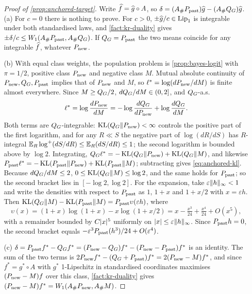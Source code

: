 \begin{proof}[Proof of \cref{prop:anchored-target}]
Write $\widehat{f}=\widehat{g}\circ A$, so $\delta=(A_\#P_{\mathrm{past}})\widehat{g}-(A_\#Q_{G})\widehat{g}$.
(a) For $c=0$ there is nothing to prove. For $c>0$, $\pm\widehat{g}/c\in\operatorname{Lip}_1$ is integrable under
both standardised laws, and \cref{fact:kr-duality} gives $\pm\delta/c\le W_{1}(A_\#P_{\mathrm{past}},A_\#Q_{G})$. If
$Q_{G}=P_{\mathrm{past}}$ the two means coincide for any integrable $\widehat{f}$, whatever $P_{\mathrm{new}}$.

(b) With equal class weights, the population problem is \cref{prop:bayes-logit} with $\pi=1/2$,
positive class $P_{\mathrm{new}}$ and negative class $M$. Mutual absolute continuity of $P_{\mathrm{new}},Q_{G},P_{\mathrm{past}}$
implies that of $P_{\mathrm{new}}$ and $M$, so $\ell^{*}=\log(dP_{\mathrm{new}}/dM)$ is finite almost everywhere. Since
$M\ge Q_{G}/2$, $dQ_{G}/dM\in(0,2]$, and $Q_{G}$-a.s.
\[
  \ell^{*}=\log\frac{dP_{\mathrm{new}}}{dM}=-\log\frac{dQ_{G}}{dP_{\mathrm{new}}}+\log\frac{dQ_{G}}{dM}.
\]
Both terms are $Q_{G}$-integrable: $\operatorname{KL}(Q_{G}\Vert P_{\mathrm{new}})<\infty$ controls the positive part of the
first logarithm, and for any $R\ll S$ the negative part of $\log(dR/dS)$ has $R$-integral
$\mathbb{E}_R\log^+(dS/dR)\le\mathbb{E}_R(dS/dR)\le1$; the second logarithm is bounded above by $\log2$. Integrating,
$Q_{G}\ell^{*}=-\operatorname{KL}(Q_{G}\Vert P_{\mathrm{new}})+\operatorname{KL}(Q_{G}\Vert M)$, and likewise
$P_{\mathrm{past}}\ell^{*}=-\operatorname{KL}(P_{\mathrm{past}}\Vert P_{\mathrm{new}})+\operatorname{KL}(P_{\mathrm{past}}\Vert M)$; subtracting gives \eqref{eq:anchored-kl}.
Because $dQ_{G}/dM\le2$, $0\le\operatorname{KL}(Q_{G}\Vert M)\le\log2$, and the same holds for $P_{\mathrm{past}}$; so the
second bracket lies in $[-\log2,\log2]$. For the expansion, take $\varepsilon\lVert h\rVert_\infty<1$
and write the densities with respect to $P_{\mathrm{past}}$ as $1$, $1+x$ and $1+x/2$ with $x=\varepsilon h$.
Then $\operatorname{KL}(Q_{G}\Vert M)-\operatorname{KL}(P_{\mathrm{past}}\Vert M)=P_{\mathrm{past}}\upsilon(\varepsilon h)$, where
\[
  \upsilon(x)=(1+x)\log(1+x)-x\log(1+x/2)=x-\tfrac{x^3}{24}+\tfrac{x^4}{24}+O(x^5),
\]
with a remainder bounded by $C\lvert x\rvert^5$ uniformly on $\lvert x\rvert\le\varepsilon\lVert h\rVert_\infty$. Since
$P_{\mathrm{past}} h=0$, the second bracket equals $-\varepsilon^3P_{\mathrm{past}}(h^3)/24+O(\varepsilon^4)$.

(c) $\delta=P_{\mathrm{past}} f^*-Q_{G} f^*=(P_{\mathrm{new}}-Q_{G})f^*-(P_{\mathrm{new}}-P_{\mathrm{past}})f^*$ is an identity. The sum of the two
terms is $2P_{\mathrm{new}} f^*-(Q_{G}+P_{\mathrm{past}})f^*=2(P_{\mathrm{new}}-M)f^*$, and since $f^*=g^*\circ A$ with $g^*$
1-Lipschitz in standardised coordinates maximises $(P_{\mathrm{new}}-M)f$ over this class,
\cref{fact:kr-duality} gives $(P_{\mathrm{new}}-M)f^*=W_{1}(A_\#P_{\mathrm{new}},A_\#M)$.
\end{proof}

